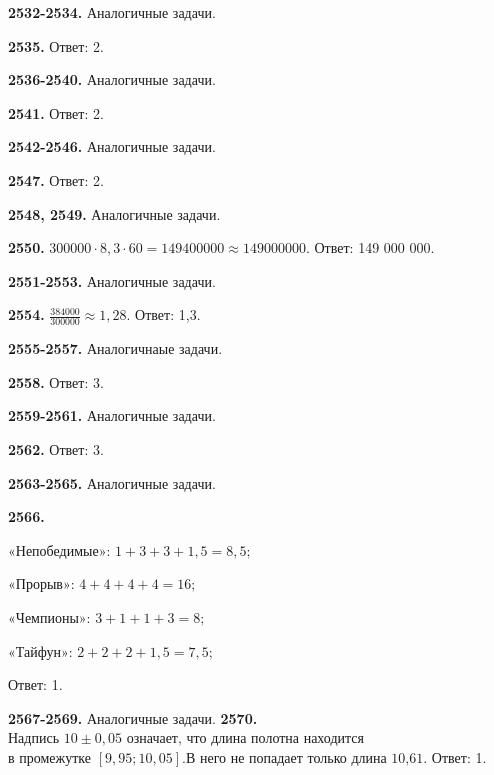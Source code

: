 \textbf{2532-2534.} Аналогичные задачи.

\textbf{2535.} Ответ: 2.

\textbf{2536-2540.} Аналогичные задачи.

\textbf{2541.} Ответ: 2.

\textbf{2542-2546.} Аналогичные задачи.

\textbf{2547.} Ответ: 2.

\textbf{2548, 2549.} Аналогичные задачи.

\textbf{2550.} $300000\cdot 8,3\cdot 60 = 149400000 \approx 149000000$.\newline \null \hspace*{\fill} Ответ: 149 000 000. 

\textbf{2551-2553.} Аналогичные задачи.

\textbf{2554.} $\frac{384000}{300000} \approx 1,28.$ \newline \null \hspace*{\fill} Ответ: 1,3. 

\textbf{2555-2557.} Аналогичнаые задачи.

\textbf{2558.} Ответ: 3.

\textbf{2559-2561.} Аналогичные задачи. 

\textbf{2562.} \newline{}\newline{} \null \hspace*{\fill} Ответ: 3. 

\textbf{2563-2565.} Аналогичные задачи.

\textbf{2566.}\newline\centerline{$\text{«Непобедимые»:    } 1 + 3 + 3 + 1,5 = 8,5;$}\newline\centerline{$\text{«Прорыв»:    } 4 + 4 + 4 + 4 = 16;$}\newline\centerline{$\text{«Чемпионы»:    } 3 + 1 + 1 + 3 = 8;$}\newline\centerline{$\text{«Тайфун»:    } 2 + 2 + 2 + 1,5 = 7,5; $} \null \hspace*{\fill} Ответ: 1. 

\textbf{2567-2569.} Аналогичные задачи.\newline
\textbf{2570.} $\text{Надпись } 10 \pm 0,05 \text{ означает, что длина полотна находится}$\newline$\text{в промежутке } [9,95;10,05].$\newline$\text{В него не попадает только длина 10,61.}$ \null \hspace*{\fill} Ответ: 1. 

